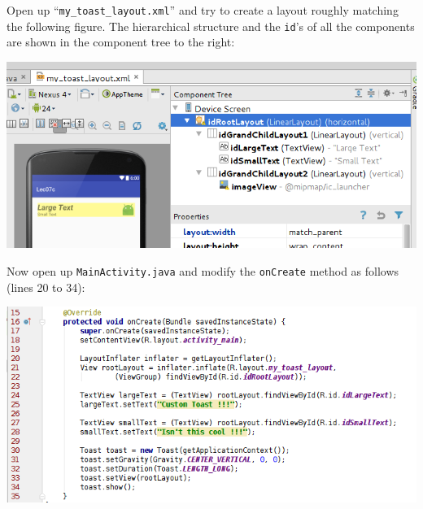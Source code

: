 Open up ``\texttt{my\_toast\_layout.xml}'' and try to create a layout roughly matching the following figure. The hierarchical structure and the \texttt{id}'s of all the components are shown in the component tree to the right:

\begin{center}
	\includegraphics[scale=0.4]{chapters/ch06/images/19}
\end{center}

Now open up \texttt{MainActivity.java} and modify the \texttt{onCreate} method as follows (lines 20 to 34):

\begin{center}
	\includegraphics[scale=0.4]{chapters/ch06/images/20}
\end{center}

